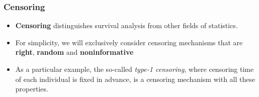 \documentclass{beamer}
\newcounter{example}
\newenvironment{wideitemize}%
  {\begin{itemize}%
    \setlength{\parskip}{1em}}%
  {\end{itemize}}
\begin{document}
\begin{frame} \frametitle{Censoring}

\begin{wideitemize}
\item {\bf Censoring} distinguishes survival analysis from other fields of statistics. 

\item For simplicity, we will exclusively consider censoring mechanisms that are {\bf right},  {\bf random} and {\bf noninformative}


\item As a particular example,  the so-called \emph{type-1 censoring}, where censoring time of each individual is fixed in advance, is a  censoring mechanism with all these properties. 
\end{wideitemize}
\end{frame}
\end{document}
